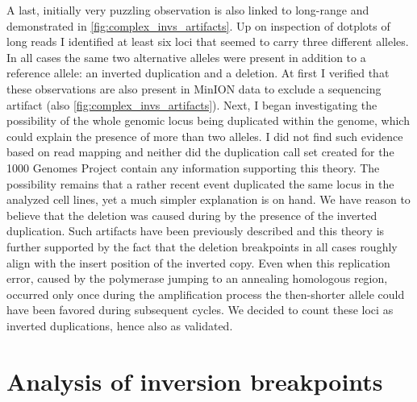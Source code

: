 A last, initially very puzzling observation is also linked to long-range \pcr
and demonstrated in \cref{fig:complex_invs_artifacts}. Up on inspection of
dotplots of long reads I identified at least six loci that seemed to carry three
different alleles. In all cases the same two alternative alleles were present in
addition to a reference allele: an inverted duplication and a deletion. At first
I verified that these observations are also present in \ont MinION data to exclude
a \pacbio sequencing artifact (also \cref{fig:complex_invs_artifacts}).
Next, I began investigating the possibility of the whole genomic locus being
duplicated within the genome, which could explain the presence of more than two
alleles. I did not find such evidence based on read mapping and neither did the
duplication call set created for the 1000 Genomes Project contain any
information supporting this theory. The possibility remains that a rather recent
event duplicated the same locus in the analyzed cell lines, yet a much simpler
explanation is on hand. We have reason to believe that the deletion was caused
during \pcr by the presence of the inverted duplication. Such \pcr artifacts
have been previously described \citep{Ji1994,Hommelsheim2015} and this theory is
further supported by the fact that the deletion breakpoints in all cases roughly
align with the insert position of the inverted copy. Even when this replication
error, caused by the polymerase jumping to an annealing homologous region,
occurred only once during the amplification process the then-shorter allele
could have been favored during subsequent \pcr cycles. We decided to count these
loci as inverted duplications, hence also as validated.






\section{Analysis of inversion breakpoints}
\label{sec:breakpoints}


